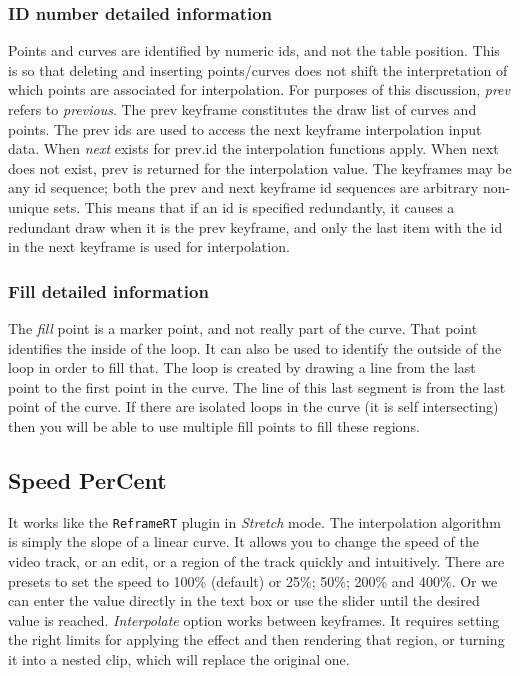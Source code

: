 \subsubsection*{ID number detailed information}%
\label{ssub:id_number_detailed_information}

Points and curves are identified by numeric ids, and not the table position. This is so that deleting and inserting points/curves does not shift the interpretation of which points are associated for interpolation. For purposes of this discussion, \textit{prev} refers to \textit{previous}. The prev keyframe constitutes the draw list of curves and points. The prev ids are used to access the next keyframe interpolation input data. When \textit{next} exists for prev.id the interpolation functions apply. When next does not exist, prev is returned for the interpolation value. The keyframes may be any id sequence; both the prev and next keyframe id sequences are arbitrary non-unique sets. This means that if an id is specified redundantly, it causes a redundant draw when it is the prev keyframe, and only the last item with the id in the next keyframe is used for interpolation.

\subsubsection*{Fill detailed information}%
\label{ssub:fill_detailed_information}

The \textit{fill} point is a marker point, and not really part of the curve. That point identifies the inside of the loop. It can also be used to identify the outside of the loop in order to fill that. The loop is created by drawing a line from the last point to the first point in the curve. The line of this last segment is from the last point of the curve. If there are isolated loops in the curve (it is self intersecting) then you will be able to use multiple fill points to fill these regions.

\subsection{Speed PerCent}%
\label{sub:speed_per_cent}

It works like the \texttt{ReframeRT} plugin in \textit{Stretch} mode. The interpolation algorithm is simply the slope of a linear curve. It allows you to change the speed of the video track, or an edit, or a region of the track quickly and intuitively. There are presets to set the speed to 100\% (default) or 25\%; 50\%; 200\% and 400\%. Or we can enter the value directly in the text box or use the slider until the desired value is reached. \textit{Interpolate} option works between keyframes. It requires setting the right limits for applying the effect and then rendering that region, or turning it into a nested clip, which will replace the original one.


